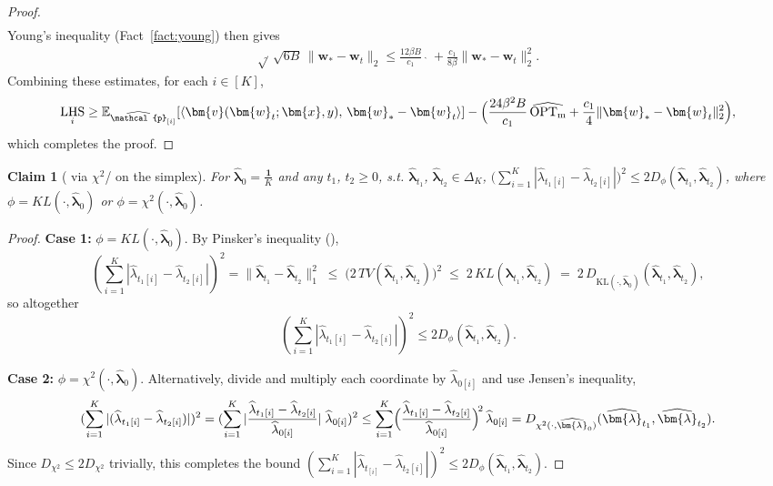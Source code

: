 \documentclass[11pt]{article}
\newcounter{thm}
\numberwithin{thm}{section}
\theoremstyle{plain}
\newtheorem{claim}[thm]{Claim}
\theoremstyle{definition}
\theoremstyle{remark} \newtheorem{remark}[thm]{Remark}
\def\vlambda{{\bm{\lambda}}}
\def\vv{{\bm{v}}}
\def\vw{{\bm{w}}}
\def\vx{{\bm{x}}}
\def\ep{\widehat{\mathcal{p}}}
\newcommand{\E}{\mathbb{E}}
\newcommand{\innp}[1]{\langle #1 \rangle}
\newcommand{\epi}{\ep_{[i]}}
\newcommand{\elambda}{\widehat{\lambda}}
\newcommand{\evlambda}{\widehat{\vlambda}}
\DeclareMathOperator{\mOPT}{OPT_m}
\DeclareMathOperator{\LHS}{LHS}
\newcommand{\mOPThat}{\widehat{\mOPT}}
\begin{document}
\begin{proof}
\begin{align*}
	\end{align*}
	Young's inequality (Fact~\ref{fact:young}) then gives
    \begin{align*}
       \sqrt{\mOPThat}\,\sqrt{6B}\,\|\vw_*-\vw_t\|_2 
	\le 
	\frac{12\beta B}{c_1}\,\mOPThat
	+\frac{c_1}{8\beta}\|\vw_*-\vw_t\|_2^2.
    \end{align*}
	Combining these estimates, for each $i \in [K]$,
    \begin{align*}
        \LHS_{i} \ge \E_{\epi}[\innp{\vv(\vw_t;\vx,y),\,\vw_*-\vw_t}] -
	\Bigl(\frac{24\beta^2 B}{c_1}\,\mOPThat+\frac{c_1}{4}\|\vw_*-\vw_t\|_2^2\Bigr),	
    \end{align*}
	which completes the proof.
\end{proof}

\begin{claim}[ via \(\chi^2\)/ on the simplex]\label{claim:ub-TV}
    For \(\evlambda_0=\frac{\bm{1}}{K}\) and any \(t_1\), \(t_2\ge 0\), s.t. \(\evlambda_{t_1}\), \(\evlambda_{t_2}\in\Delta_K\), \(\big(\sum_{i=1}^K|\elambda_{t_1[i]}-\elambda_{t_2[i]}|\big)^2\le 2D_{\phi}(\evlambda_{t_1},\evlambda_{t_2})\), where \(\phi = \textit{KL}(\cdot,\evlambda_0)\) or \(\phi = \chi^2(\cdot,\evlambda_0)\).
\end{claim}
\begin{proof}
    \noindent\textbf{Case 1:} $\phi = \textit{KL}(\cdot,\evlambda_0)$. By Pinsker's inequality (),
	\[
    (\sum_{i=1}^K|\elambda_{t_1[i]}-\elambda_{t_2[i]}|)^2=
	\| \evlambda_{t_1}-\evlambda_{t_2}\|_1^2
	\;\le\; \bigl(2\,TV(\evlambda_{t_1},\evlambda_{t_2})\bigr)^2
	\;\le\;2\,KL(\evlambda_{t_1},\evlambda_{t_2})
	\;=\;2\,D_{\text{KL}(\cdot,\evlambda_0)}(\evlambda_{t_1},\evlambda_{t_2}),
	\]
	so altogether
	\[
	(\sum_{i=1}^K|\elambda_{t_1[i]}-\elambda_{t_2[i]}|)^2\le 2D_{\phi}(\evlambda_{t_1},\evlambda_{t_2}).
	\]
	
	\medskip
	
	\noindent\textbf{Case 2:} $\phi = \chi^2(\cdot,\evlambda_0)$.
	Alternatively, divide and multiply each coordinate by \(\elambda_{0[i]}\) and use Jensen's inequality,
	\[
    (\sum_{i=1}^K|(\elambda_{t_1[i]}-\elambda_{t_2[i]})|)^2
	=(\sum_{i=1}^K|\frac{\elambda_{t_1[i]}-\elambda_{t_2[i]}}{\elambda_{0[i]}}|\;\elambda_{0[i]})^2 \le \sum_{i=1}^K
	\Bigl(\frac{\elambda_{t_1[i]}-\elambda_{t_2[i]}}{\elambda_{0[i]}}\Bigr)^{\!2}
	\,\elambda_{0[i]}
	= D_{\chi^2(\cdot,\evlambda_0)}(\evlambda_{t_1},\evlambda_{t_2}).
	\]
	Since $D_{\chi^2}\le2D_{\chi^2}$ trivially, this completes the bound
	\(
	(\sum_{i=1}^K|\elambda_{t_[i]}-\elambda_{t_2[i]}|)^2\le 2D_{\phi}(\evlambda_{t_1},\evlambda_{t_2}).
	\)
\end{proof}
\end{document}
